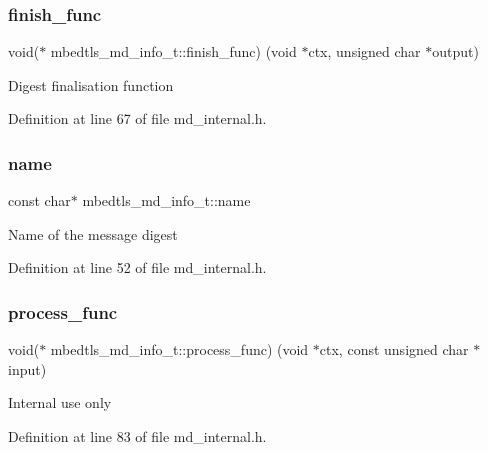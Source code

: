\subsubsection{\texorpdfstring{finish\+\_\+func}{finish\_func}}
{\footnotesize\ttfamily void($\ast$ mbedtls\+\_\+md\+\_\+info\+\_\+t\+::finish\+\_\+func) (void $\ast$ctx, unsigned char $\ast$output)}

Digest finalisation function 

Definition at line 67 of file md\+\_\+internal.\+h.

\mbox{\label{structmbedtls__md__info__t_a91340331832845c885d99884426d21c6}} 
\subsubsection{\texorpdfstring{name}{name}}
{\footnotesize\ttfamily const char$\ast$ mbedtls\+\_\+md\+\_\+info\+\_\+t\+::name}

Name of the message digest 

Definition at line 52 of file md\+\_\+internal.\+h.

\mbox{\label{structmbedtls__md__info__t_af5456d53add6cfe02fee1e3e4912ff05}} 
\subsubsection{\texorpdfstring{process\+\_\+func}{process\_func}}
{\footnotesize\ttfamily void($\ast$ mbedtls\+\_\+md\+\_\+info\+\_\+t\+::process\+\_\+func) (void $\ast$ctx, const unsigned char $\ast$input)}

Internal use only 

Definition at line 83 of file md\+\_\+internal.\+h.

\mbox{\label{structmbedtls__md__info__t_a17a6641cfc5d4e7542d450463c4122f6}} 
